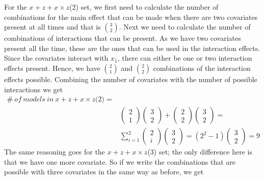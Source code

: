 For the $x + z + x \times z$(2) set, we first need to calculate the number of combinations for the main effect that can be made when there are two covariates present at all times and that is $\binom{3}{2}$. Next we need to calculate the number of combinations of interactions that can be present. As we have two covariates present all the time, these are the ones that can be used in the interaction effects. Since the covariates interact with $x_1$, there can either be one or two interaction effects present. Hence, we have $\binom{2}{1}$ and $\binom{2}{2}$ combinations of the interaction effects possible. Combining the number of covariates with the number of possible interactions we get
\begin{equation*}
\begin{aligned}
\#\ of\ models\ in\ x + z +x \times z\textit{(2)}=\\
& \left( \begin{array}{c}
2 \\ 
1 \end{array}
\right)\left( \begin{array}{c}
3 \\ 
2 \end{array}
\right)+\left( \begin{array}{c}
2 \\ 
2 \end{array}
\right)\left( \begin{array}{c}
3 \\ 
2 \end{array}
\right)=\\
&\sum^2_{i=1}{\left( \begin{array}{c}
2 \\ 
i \end{array}
\right)}\left( \begin{array}{c}
3 \\ 
2 \end{array}
\right)=\left(2^2-1\right)\left( \begin{array}{c}
3 \\ 
2 \end{array}
\right)=9

\end{aligned}
\end{equation*}
The same reasoning goes for the $x + z + x \times z$(3) set; the only difference here is that we have one more covariate. So if we write the combinations that are possible with three covariates in the same way as before, we get
